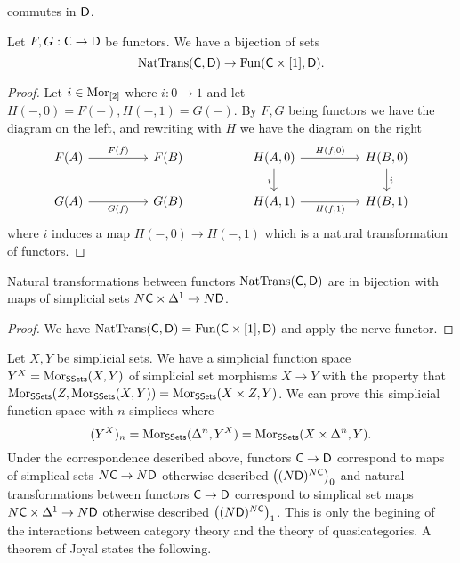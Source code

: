 commutes in $\mathsf{D}$. 
\begin{proposition}
  Let $F,G:\mathsf{C}\to\mathsf{D}$ be functors. We have a bijection of sets $$\mathrm{NatTrans}(\mathsf{C},\mathsf{D})\to\mathrm{Fun}(\mathsf{C}\times[1],\mathsf{D}).$$ 
\end{proposition}
\begin{proof}
  Let $i\in\mathrm{Mor}_{[2]}$ where $i:0\to 1$ and let $H(-,0)=F(-), H(-,1)=G(-)$. By $F,G$ being functors we have the diagram on the left, and rewriting with $H$ we have the diagram on the right
  $$%
  \begin{tikzcd}
    {F(A)} && {F(B)} && {H(A,0)} && {H(B,0)} \\
    {G(A)} && {G(B)} && {H(A,1)} && {H(B,1)}
    \arrow["{F(f)}", from=1-1, to=1-3]
    \arrow["{G(f)}"', from=2-1, to=2-3]
    \arrow["i", from=1-7, to=2-7]
    \arrow["i"', from=1-5, to=2-5]
    \arrow["{H(f,0)}", from=1-5, to=1-7]
    \arrow["{H(f,1)}"', from=2-5, to=2-7]
  \end{tikzcd}$$
  where $i$ induces a map $H(-,0)\to H(-,1)$ which is a natural transformation of functors.  
\end{proof}
\begin{corollary}
  Natural transformations between functors $\mathrm{NatTrans}(\mathsf{C},\mathsf{D})$ are in bijection with maps of simplicial sets $N\mathsf{C}\times\Delta^{1}\to N\mathsf{D}$. 
\end{corollary}
\begin{proof}
  We have $\mathrm{NatTrans}(\mathsf{C},\mathsf{D})=\mathrm{Fun}(\mathsf{C}\times[1],\mathsf{D})$ and apply the nerve functor.
\end{proof}
Let $X,Y$ be simplicial sets. We have a simplicial function space $Y^{X}=\mathrm{Mor}_{\mathsf{SSets}}(X,Y)$ of simplicial set morphisms $X\to Y$ with the property that $\mathrm{Mor}_{\mathsf{SSets}}(Z,\mathrm{Mor}_{\mathsf{SSets}}(X,Y))=\mathrm{Mor}_{\mathsf{SSets}}(X\times Z,Y)$. We can prove this simplicial function space with $n$-simplices where 
$$(Y^{X})_{n}=\mathrm{Mor}_{\mathsf{SSets}}(\Delta^{n},Y^{X})=\mathrm{Mor}_{\mathsf{SSets}}(X\times\Delta^{n},Y).$$
Under the correspondence described above, functors $\mathsf{C}\to\mathsf{D}$ correspond to maps of simplical sets $N\mathsf{C}\to N\mathsf{D}$ otherwise described $\left((N\mathsf{D})^{N\mathsf{C}}\right)_{0}$ and natural transformations between functors $\mathsf{C}\to\mathsf{D}$ correspond to simplical set maps $N\mathsf{C}\times\Delta^{1}\to N\mathsf{D}$ otherwise described $\left((N\mathsf{D})^{N\mathsf{C}}\right)_{1}$. This is only the begining of the interactions between category theory and the theory of quasicategories. A theorem of Joyal states the following. 
